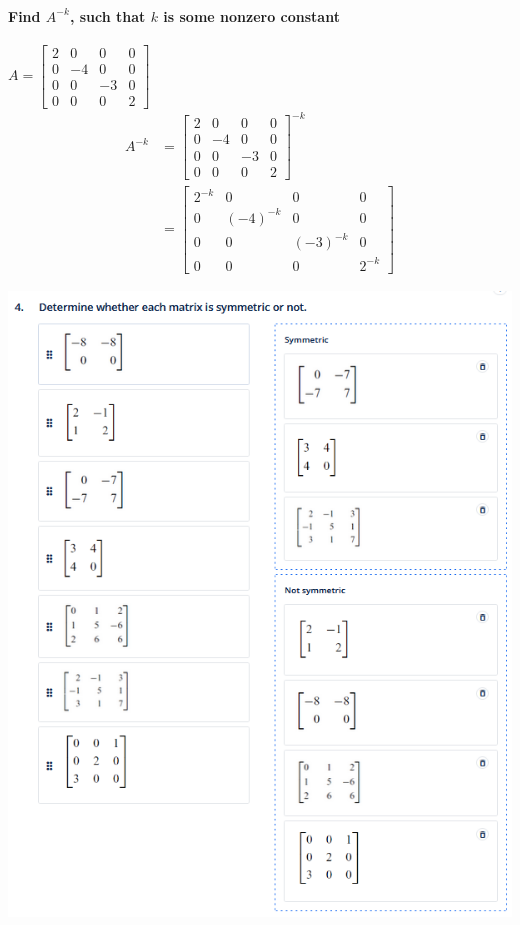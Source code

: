 \documentclass[
  letterpaper,
  DIV=11,
  numbers=noendperiod]{scrartcl}
\let\oldparagraph\paragraph
\renewcommand{\paragraph}[1]{\oldparagraph{#1}\mbox{}}
\begin{document}
\newpage{}

\hypertarget{find-a-k-such-that-k-is-some-nonzero-constant}{%
\paragraph{\texorpdfstring{Find \(A^{-k}\), such that \(k\) is some
nonzero
constant}{Find A\^{}\{-k\}, such that k is some nonzero constant}}\label{find-a-k-such-that-k-is-some-nonzero-constant}}

\(A=\begin{bmatrix}2 & 0 & 0 & 0 \\ 0 & -4 & 0 & 0 \\ 0 & 0 & -3 & 0 \\ 0 & 0 & 0 & 2 \end{bmatrix}\)
\begin{align*}
A^{-k} &= \begin{bmatrix}2 & 0 & 0 & 0 \\ 0 & -4 & 0 & 0 \\ 0 & 0 & -3 & 0 \\ 0 & 0 & 0 & 2 \end{bmatrix}^{-k} \\
&= \begin{bmatrix}2^{-k} & 0 & 0 & 0 \\ 0 & (-4)^{-k} & 0 & 0 \\ 0 & 0 & (-3)^{-k} & 0 \\ 0 & 0 & 0 & 2^{-k} \end{bmatrix}
\end{align*}

\includegraphics{img/symmetric-or-not.png}
\end{document}
